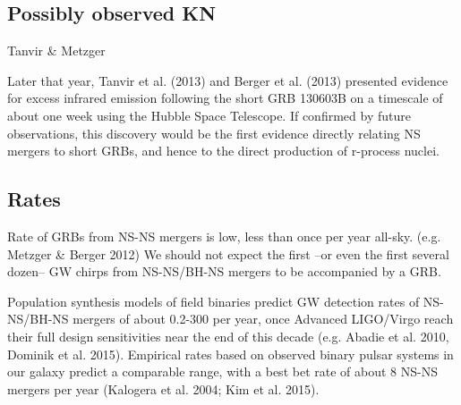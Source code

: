 \subsection{Possibly observed KN}

Tanvir \& Metzger

Later that year, Tanvir et al. (2013) and Berger et al. (2013) presented evidence for excess infrared emission following the short GRB 130603B on a timescale of about one week using the Hubble Space Telescope. If confirmed by future observations, this discovery would be the first evidence directly relating NS mergers to short GRBs, and hence to the direct production of r-process nuclei.

\subsection{Rates}

Rate of GRBs from NS-NS mergers is low, less than once per year all-sky. (e.g. Metzger \& Berger 2012)
We should not expect the first --or even the first several dozen-- GW chirps from NS-NS/BH-NS mergers to be accompanied by a GRB.


Population synthesis models of field binaries predict GW detection rates of NS-NS/BH-NS mergers of about 0.2-300 per year, once Advanced LIGO/Virgo reach their full design sensitivities near the end of this decade (e.g. Abadie et al. 2010, Dominik et al. 2015).
Empirical rates based on observed binary pulsar systems in our galaxy predict a comparable range, with a best bet rate of about 8 NS-NS mergers per year (Kalogera et al. 2004; Kim et al. 2015).

